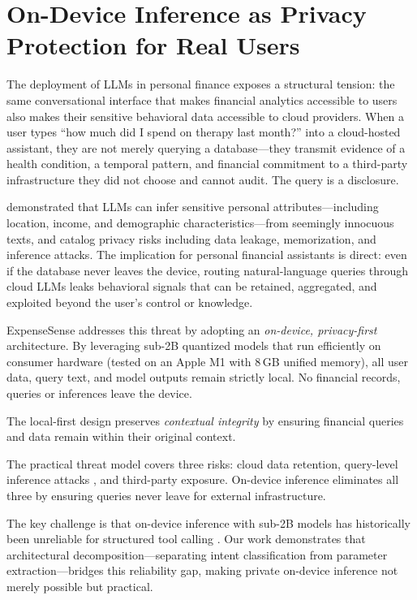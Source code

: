 \documentclass[11pt,twocolumn]{article}
\begin{document}
\section{On-Device Inference as Privacy Protection for Real Users}
\label{sec:privacy}

The deployment of LLMs in personal finance exposes a structural
tension: the same conversational interface that makes financial
analytics accessible to users also makes their sensitive
behavioral data accessible to cloud providers.
When a user types ``how much did I spend on therapy last month?'' into
a cloud-hosted assistant, they are not merely querying a
database---they transmit evidence of a health condition, a temporal 
pattern, and financial commitment to a third-party infrastructure 
they did not choose and cannot audit. The query is a disclosure.

\citet{staab2024memorization} demonstrated that LLMs can infer
sensitive personal attributes---including location, income, and
demographic characteristics---from seemingly innocuous texts, and
\citet{yao2024survey} catalog privacy risks including data leakage,
memorization, and inference attacks.
The implication for personal financial assistants is direct: even if the
database never leaves the device, routing natural-language queries
through cloud LLMs leaks behavioral signals that can be retained,
aggregated, and exploited beyond the user's control or knowledge.

ExpenseSense addresses this threat by adopting an \emph{on-device,
privacy-first} architecture.
By leveraging sub-2B quantized models that run efficiently on consumer
hardware (tested on an Apple M1 with 8\,GB unified memory), all user
data, query text, and model outputs remain strictly local.
No financial records, queries or inferences leave the device.

The local-first design preserves \emph{contextual integrity}
\citep{nissenbaum2004privacy} by ensuring financial queries and data
remain within their original context.

The practical threat model covers three risks: cloud data retention, query-level
inference attacks \citep{staab2024memorization}, and third-party exposure.
On-device inference eliminates all three by ensuring queries never
leave for external infrastructure.

The key challenge is that on-device inference with sub-2B models has
historically been unreliable for structured tool calling
\citep{kavathekar2025small}.
Our work demonstrates that architectural decomposition---separating
intent classification from parameter extraction---bridges this
reliability gap, making private on-device inference not merely
possible but practical.
\end{document}
